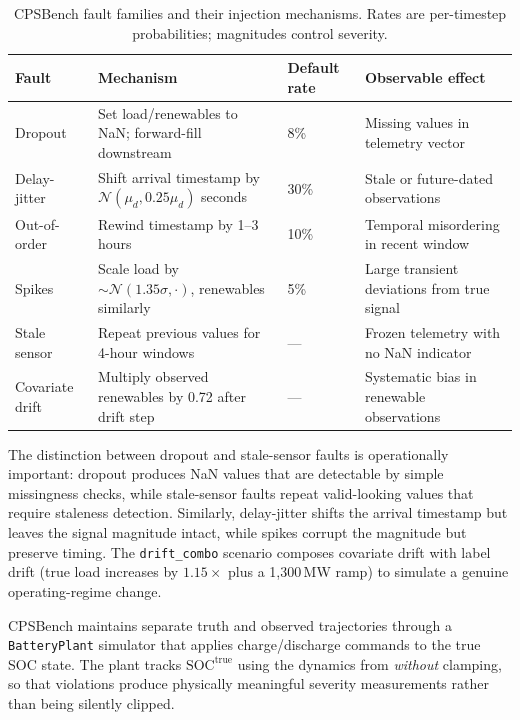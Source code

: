 \documentclass[11pt,a4paper]{article}
\begin{document}
\begin{table}[htbp]
\centering\small
\caption{CPSBench fault families and their injection mechanisms. Rates are per-timestep probabilities; magnitudes control severity.}
\label{tab:fault_families}
\begin{tabular}{p{2.2cm}p{3.2cm}p{2.2cm}p{5.0cm}}
\toprule
Fault & Mechanism & Default rate & Observable effect \\
\midrule
Dropout & Set load/renewables to NaN; forward-fill downstream & 8\% & Missing values in telemetry vector \\
Delay-jitter & Shift arrival timestamp by $\mathcal{N}(\mu_d, 0.25\mu_d)$ seconds & 30\% & Stale or future-dated observations \\
Out-of-order & Rewind timestamp by 1--3 hours & 10\% & Temporal misordering in recent window \\
Spikes & Scale load by $\sim\!\mathcal{N}(1.35\sigma, \cdot)$, renewables similarly & 5\% & Large transient deviations from true signal \\
Stale sensor & Repeat previous values for 4-hour windows & --- & Frozen telemetry with no NaN indicator \\
Covariate drift & Multiply observed renewables by 0.72 after drift step & --- & Systematic bias in renewable observations \\
\bottomrule
\end{tabular}
\end{table}

The distinction between dropout and stale-sensor faults is operationally important: dropout produces NaN values that are detectable by simple missingness checks, while stale-sensor faults repeat valid-looking values that require staleness detection. Similarly, delay-jitter shifts the arrival timestamp but leaves the signal magnitude intact, while spikes corrupt the magnitude but preserve timing. The \texttt{drift\_combo} scenario composes covariate drift with label drift (true load increases by $1.15\times$ plus a 1{,}300\,MW ramp) to simulate a genuine operating-regime change.

CPSBench maintains separate truth and observed trajectories through a \texttt{BatteryPlant} simulator that applies charge/discharge commands to the true SOC state. The plant tracks $\mathrm{SOC}^{\mathrm{true}}$ using the dynamics from  \emph{without} clamping, so that violations produce physically meaningful severity measurements rather than being silently clipped.
\end{document}
